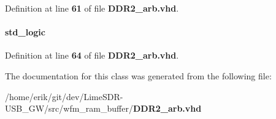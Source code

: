 Definition at line {\bf 61} of file {\bf D\+D\+R2\+\_\+arb.\+vhd}.

\paragraph[{write\+\_\+req}]{ {\bfseries \textcolor{comment}{std\+\_\+logic}\textcolor{vhdlchar}{ }} \hspace{0.3cm}{\ttfamily [Signal]}}\label{classDDR2__arb_1_1arch_a49f046fd04005eea84c07ed92727d30b}


Definition at line {\bf 64} of file {\bf D\+D\+R2\+\_\+arb.\+vhd}.



The documentation for this class was generated from the following file\+:\begin{DoxyCompactItemize}
\item 
/home/erik/git/dev/\+Lime\+S\+D\+R-\/\+U\+S\+B\+\_\+\+G\+W/src/wfm\+\_\+ram\+\_\+buffer/{\bf D\+D\+R2\+\_\+arb.\+vhd}\end{DoxyCompactItemize}
